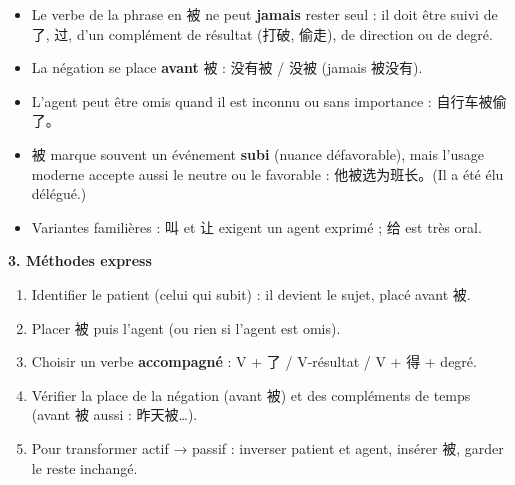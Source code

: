 \documentclass[11pt]{article}
\newcommand{\cle}[1]{{\popxbold\color{popdark}#1}}
\begin{document}
\begin{bilan}
\begin{itemize}
\item Le verbe de la phrase en 被 ne peut \textbf{jamais} rester seul : il doit être suivi de 了, 过, d'un complément de résultat (打破, 偷走), de direction ou de degré.
\item La négation se place \textbf{avant} 被 : 没有被 / 没被 (jamais 被没有).
\item L'agent peut être omis quand il est inconnu ou sans importance : 自行车被偷了。
\item 被 marque souvent un événement \textbf{subi} (nuance défavorable), mais l'usage moderne accepte aussi le neutre ou le favorable : 他被选为班长。(Il a été élu délégué.)
\item Variantes familières : 叫 et 让 exigent un agent exprimé ; 给 est très oral.
\end{itemize}

\textbf{3. Méthodes express}
\begin{enumerate}
\item Identifier le \cle{patient} (celui qui subit) : il devient le sujet, placé avant 被.
\item Placer \cle{被} puis l'agent (ou rien si l'agent est omis).
\item Choisir un verbe \textbf{accompagné} : V + 了 / V-résultat / V + 得 + degré.
\item Vérifier la place de la négation (avant 被) et des compléments de temps (avant 被 aussi : 昨天被…).
\item Pour transformer actif → passif : inverser patient et agent, insérer 被, garder le reste inchangé.
\end{enumerate}
\end{bilan}
\end{document}
